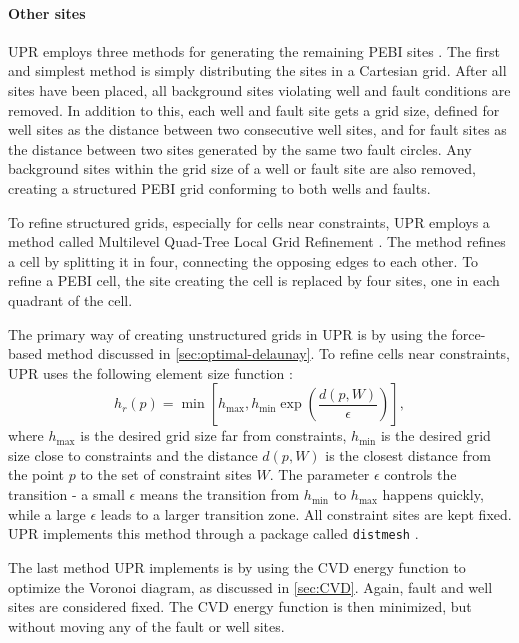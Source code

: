 \paragraph{Other sites}
UPR employs three methods for generating the remaining PEBI sites \cite{UPR_thesis}. The first and simplest method is simply distributing the sites in a Cartesian grid. After all sites have been placed, all background sites violating well and fault conditions are removed. In addition to this, each well and fault site gets a grid size, defined for well sites as the distance between two consecutive well sites, and for fault sites as the distance between two sites generated by the same two fault circles. Any background sites within the grid size of a well or fault site are also removed, creating a structured PEBI grid conforming to both wells and faults.

To refine structured grids, especially for cells near constraints, UPR employs a method called Multilevel Quad-Tree Local Grid Refinement \cite[pp.49]{UPR_thesis}. The method refines a cell by splitting it in four, connecting the opposing edges to each other. To refine a PEBI cell, the site creating the cell is replaced by four sites, one in each quadrant of the cell.

The primary way of creating unstructured grids in UPR is by using the force-based method discussed in \autoref{sec:optimal-delaunay}. To refine cells near constraints, UPR uses the following element size function \cite[Equation 4.2]{UPR_thesis}:
\begin{equation}
    h_r(p) = \min \left[
        h_{\max}, h_{\min} \exp \left(
            \frac{d(p, W)}{\epsilon}
        \right) \right],
\end{equation}
where $h_{\max}$ is the desired grid size far from constraints, $h_{\min}$ is the desired grid size close to constraints and the distance $d(p, W)$ is the closest distance from the point $p$ to the set of constraint sites $W$. The parameter $\epsilon$ controls the transition - a small $\epsilon$ means the transition from $h_{\min}$ to $h_{\max}$ happens quickly, while a large $\epsilon$ leads to a larger transition zone. All constraint sites are kept fixed. UPR implements this method through a package called \verb|distmesh| \cite{Distmesh}.

The last method UPR implements is by using the CVD energy function to optimize the Voronoi diagram, as discussed in \autoref{sec:CVD}. Again, fault and well sites are considered fixed. The CVD energy function is then minimized, but without moving any of the fault or well sites.

